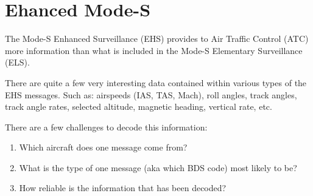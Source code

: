 \chapter{Ehanced Mode-S}

The Mode-S Enhanced Surveillance (EHS) provides to Air Traffic Control (ATC) more information than what is included in the Mode-S Elementary Surveillance (ELS).

There are quite a few very interesting data contained within various types of the EHS messages. Such as: airspeeds (IAS, TAS, Mach), roll angles, track angles, track angle rates, selected altitude, magnetic heading, vertical rate, etc.

There are a few challenges to decode this information:
\begin{enumerate}
  \item Which aircraft does one message come from?
  \item What is the type of one message (aka which BDS code) most likely to be?
  \item How reliable is the information that has been decoded?
\end{enumerate}
